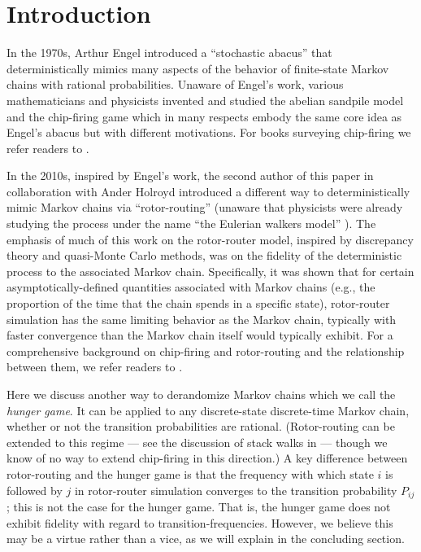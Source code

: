 \section{Introduction}\label{section: introduction}
In the 1970s, Arthur Engel \cite{engel1975probabilistic,engel1976does} 
introduced a ``stochastic abacus''
that deterministically mimics many aspects of the behavior
of finite-state Markov chains with rational probabilities.
Unaware of Engel's work, various mathematicians and physicists
invented and studied the abelian sandpile model \cite{dhar1990self} 
and the chip-firing game \cite{bjorner1991chip}
which in many respects embody the same core idea as Engel's abacus
but with different motivations.
For books surveying chip-firing we refer readers to 
\cite{klivans2018mathematics,corry2018divisors}.

In the 2010s, inspired by Engel's work, the second author of this paper 
in collaboration with Ander Holroyd 
\cite{holroyd2010rotor} 
introduced a different way to deterministically mimic Markov chains
via ``rotor-routing'' (unaware that physicists were already studying
the process under the name ``the Eulerian walkers model'' 
\cite{priezzhev1996eulerian}).
The emphasis of much of this work on the rotor-router model,
inspired by discrepancy theory and quasi-Monte Carlo methods,
was on the fidelity of the deterministic process to the associated Markov chain.
Specifically, it was shown that for certain 
asymptotically-defined quantities associated with Markov chains
(e.g., the proportion of the time that the chain spends in a specific state),
rotor-router simulation has the same limiting behavior as the Markov chain,
typically with faster convergence than 
the Markov chain itself would typically exhibit.
For a comprehensive background on chip-firing and rotor-routing and 
the relationship between them, we refer readers to \cite{holroyd2008chip}.

Here we discuss another way to derandomize Markov chains
which we call the {\em hunger game}.
It can be applied to any discrete-state discrete-time Markov chain,
whether or not the transition probabilities are rational.
(Rotor-routing can be extended to this regime --- 
see the discussion of stack walks in \cite{holroyd2010rotor} ---
though we know of no way to extend chip-firing in this direction.)
A key difference between rotor-routing and the hunger game
is that the frequency with which state $i$ is followed by $j$
in rotor-router simulation converges to the transition probability $P_{ij}$;
this is not the case for the hunger game.
That is, the hunger game does not exhibit fidelity 
with regard to transition-frequencies. 
However, we believe this may be a virtue rather than a vice,
as we will explain in the concluding section.

